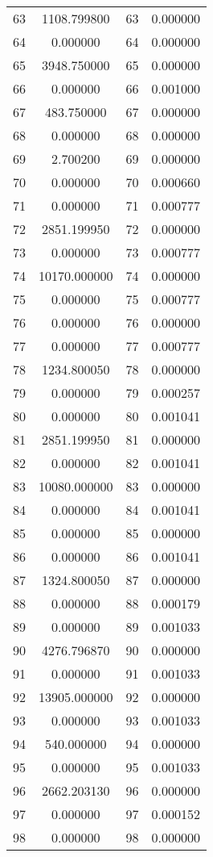 \documentclass[12pt]{article}
\begin{document}
\begin{longtable}{@{}cccc@{}}
63 & 1108.799800 & 63 & 0.000000 \\
64 & 0.000000 & 64 & 0.000000 \\
65 & 3948.750000 & 65 & 0.000000 \\
66 & 0.000000 & 66 & 0.001000 \\
67 & 483.750000 & 67 & 0.000000 \\
68 & 0.000000 & 68 & 0.000000 \\
69 & 2.700200 & 69 & 0.000000 \\
70 & 0.000000 & 70 & 0.000660 \\
71 & 0.000000 & 71 & 0.000777 \\
72 & 2851.199950 & 72 & 0.000000 \\
73 & 0.000000 & 73 & 0.000777 \\
74 & 10170.000000 & 74 & 0.000000 \\
75 & 0.000000 & 75 & 0.000777 \\
76 & 0.000000 & 76 & 0.000000 \\
77 & 0.000000 & 77 & 0.000777 \\
78 & 1234.800050 & 78 & 0.000000 \\
79 & 0.000000 & 79 & 0.000257 \\
80 & 0.000000 & 80 & 0.001041 \\
81 & 2851.199950 & 81 & 0.000000 \\
82 & 0.000000 & 82 & 0.001041 \\
83 & 10080.000000 & 83 & 0.000000 \\
84 & 0.000000 & 84 & 0.001041 \\
85 & 0.000000 & 85 & 0.000000 \\
86 & 0.000000 & 86 & 0.001041 \\
87 & 1324.800050 & 87 & 0.000000 \\
88 & 0.000000 & 88 & 0.000179 \\
89 & 0.000000 & 89 & 0.001033 \\
90 & 4276.796870 & 90 & 0.000000 \\
91 & 0.000000 & 91 & 0.001033 \\
92 & 13905.000000 & 92 & 0.000000 \\
93 & 0.000000 & 93 & 0.001033 \\
94 & 540.000000 & 94 & 0.000000 \\
95 & 0.000000 & 95 & 0.001033 \\
96 & 2662.203130 & 96 & 0.000000 \\
97 & 0.000000 & 97 & 0.000152 \\
98 & 0.000000 & 98 & 0.000000 \\

\end{longtable}
\end{document}
